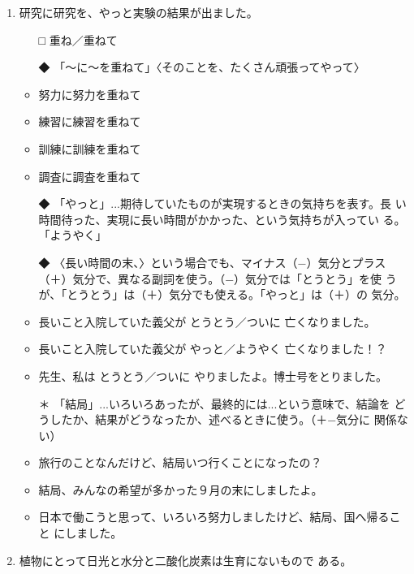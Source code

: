 \documentclass[
uplatex,
b5paper,
10pt,
dvipdfmx
]{jsbook}
\begin{document}
\begin{enumerate}
\item 研究に研究を\underline{\hspace{3zw}}、やっと実験の結果が出ました。
\begin{itemize}
\item[□] 重ね／重ねて
\item[◆] 「〜に〜を重ねて」〈そのことを、たくさん頑張ってやって〉
\end{itemize}
\begin{itemize}
 \item 努力に努力を重ねて
 \item 練習に練習を重ねて
 \item 訓練に訓練を重ねて
 \item 調査に調査を重ねて
\end{itemize}
\begin{itemize}
\item[◆] 「やっと」...期待していたものが実現するときの気持ちを表す。長
	  い時間待った、実現に長い時間がかかった、という気持ちが入ってい
	  る。「ようやく」
\item[◆] 〈長い時間の末、〉という場合でも、マイナス（−）気分とプラス
	  （＋）気分で、異なる副詞を使う。（−）気分では「とうとう」を使
	  うが、「とうとう」は（＋）気分でも使える。「やっと」は（＋）の
	  気分。
\end{itemize}
\begin{itemize}
\item 長いこと入院していた義父が とうとう／ついに 亡くなりました。
\item 長いこと入院していた義父が やっと／ようやく 亡くなりました！？
\item 先生、私は とうとう／ついに やりましたよ。博士号をとりました。
\item[＊] 「結局」...いろいろあったが、最終的には...という意味で、結論を
	  どうしたか、結果がどうなったか、述べるときに使う。（＋−気分に
	  関係ない）
\item 旅行のことなんだけど、結局いつ行くことになったの？
\item 結局、みんなの希望が多かった９月の末にしましたよ。
\item 日本で働こうと思って、いろいろ努力しましたけど、結局、国へ帰ること
      にしました。
\end{itemize}

\item 植物にとって日光と水分と二酸化炭素は生育に\underline{\hspace{3zw}}ないもので
      ある。


\end{enumerate}
\end{document}
